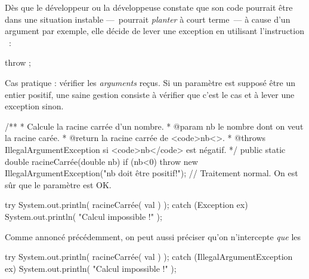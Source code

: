 Dès que le développeur ou la développeuse constate que son code pourrait être dans une situation instable —~pourrait \textit{planter} à court terme~— à cause d'un argument par exemple, elle décide de lever une exception en utilisant l'instruction ~:

\begin{grammaire}
	    throw ;
\end{grammaire}

Cas pratique : vérifier les \emph{arguments} reçus.
Si un paramètre est supposé être un entier positif, une saine gestion consiste à vérifier que c'est le cas et à lever une exception sinon.

\begin{java}
  /**
   * Calcule la racine carrée d'un nombre.
   * @param nb le nombre dont on veut la racine carée.
   * @return la racine carrée de <code>nb<\code>.
   * @throws IllegalArgumentException si <code>nb</code> est négatif.
   */
  public static double racineCarrée(double nb) {
    if (nb<0) {
      throw new IllegalArgumentException("nb doit être positif!");
    }
    // Traitement normal. On est sûr que le paramètre est OK.
  }
\end{java}


\begin{java}
  try {
    System.out.println( racineCarrée( val ) );
  } catch (Exception ex) {
    System.out.println( "Calcul impossible !" );
  }
\end{java}

Comme annoncé précédemment, on peut aussi préciser qu'on n'intercepte \emph{que} les 
\begin{java}
  try {
    System.out.println( racineCarrée( val ) );
  } catch (IllegalArgumentException ex) {
    System.out.println( "Calcul impossible !" );
  }
\end{java}



